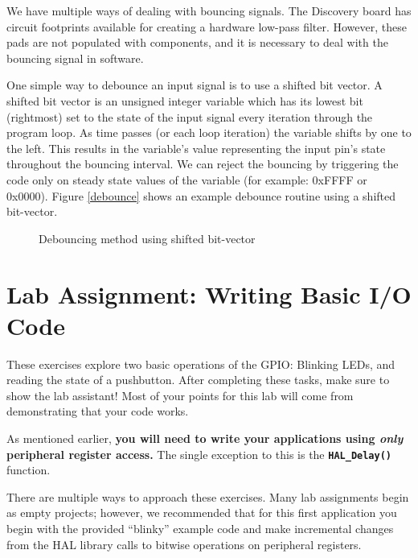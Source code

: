 \documentclass[11pt,fleqn]{book} %
\newcommand{\code}[3]{
    \begin{figure}[]
        \begin{center}
            \hspace*{-3.4cm}
            \colorbox{gray!20!white}{
                \parbox{0.8\paperwidth} {
                    
                }
            }
            \caption{#2}
            \label{#3}
        \end{center}
    \end{figure}
}
\begin{document}
We have multiple ways of dealing with bouncing signals. The Discovery board has circuit footprints available for creating a hardware low-pass filter. However, these pads are not populated with components, and it is necessary to deal with the bouncing signal in software.

One simple way to debounce an input signal is to use a shifted bit vector. A shifted bit vector is an unsigned integer variable which has its lowest bit (rightmost) set to the state of the input signal every iteration through the program loop. As time passes (or each loop iteration) the variable shifts by one to the left. This results in the variable's value representing the input pin's state throughout the bouncing interval. We can reject the bouncing by triggering the code only on steady state values of the variable (for example: 0xFFFF or 0x0000). Figure \vref{debounce} shows an example debounce routine using a shifted bit-vector.

\code{./files/debounce.c}{Debouncing method using shifted bit-vector}{debounce}

\section{Lab Assignment: Writing Basic I/O Code}

These exercises explore two basic operations of the GPIO: Blinking LEDs, and reading the state of a pushbutton.
After completing these tasks, make sure to show the lab assistant! Most of your points for this lab will come from demonstrating that your code works. 
\begin{warning}
As mentioned earlier, \textbf{you will need to write your applications using \textit{only} peripheral register access.} The single exception to this is the \texttt{\textbf{HAL\_Delay()}} function.
\end{warning}

There are multiple ways to approach these exercises. Many lab assignments begin as empty projects; however, we recommended that for this first application you begin with the provided ``blinky'' example code and make incremental changes from the HAL library calls to bitwise operations on peripheral registers.
\end{document}
